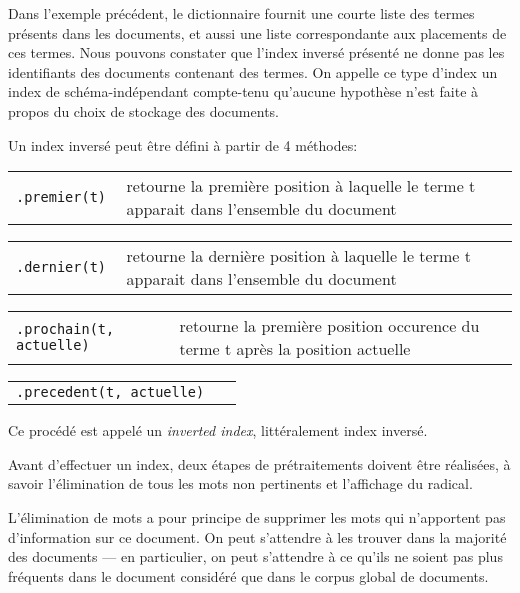 Dans l'exemple précédent, le dictionnaire fournit une courte
liste des termes présents dans les documents, et aussi une
liste correspondante aux placements de ces termes. Nous pouvons
constater que l'index inversé présenté ne donne pas les
identifiants des documents contenant des termes.
{\color{red} On appelle ce type d'index un index de
schéma-indépendant compte-tenu qu'aucune hypothèse
n'est faite à propos du choix de stockage des documents}.

Un index inversé peut être défini à partir de 4 méthodes:

\begin{addmargin}{.5cm}

\begin{tabular}{l p{11cm}}
\tt .premier(t) & retourne la première position à
                  laquelle le terme t apparait dans
                  l'ensemble du document
\end{tabular}

\begin{tabular}{l p{11cm}}
\tt .dernier(t) & retourne la dernière position à
                  laquelle le terme t apparait dans
                  l'ensemble du document
\end{tabular}

\begin{tabular}{l p{8.2cm}}
\tt .prochain(t, actuelle) & retourne la première position
                             occurence du terme t après la
                             position actuelle
\end{tabular}

\begin{tabular}{l p{8.1cm}}
\tt .precedent(t, actuelle) &
\end{tabular}

\end{addmargin}

Ce procédé est appelé un {\it inverted index},
littéralement index inversé.

Avant d'effectuer un index, deux étapes de prétraitements
doivent être réalisées, à savoir l'élimination de tous
les mots non pertinents et l'affichage du radical.

L'élimination de mots a pour principe de supprimer les mots
qui n'apportent pas d'information sur ce document.
On peut s'attendre à les trouver dans la majorité des documents
\---- en particulier, on peut s'attendre à ce qu'ils ne soient
pas plus fréquents dans le document considéré que dans le corpus
global de documents.

